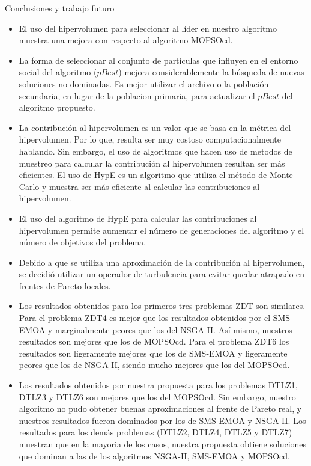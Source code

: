 \begin{chapter}{Conclusiones y trabajo futuro}
\begin{itemize}
  \item El uso del hipervolumen para seleccionar al l\'ider en nuestro algoritmo muestra una mejora con respecto al algoritmo MOPSOcd. 
  
  \item La forma de seleccionar al conjunto de part\'iculas que influyen en el entorno social  del algoritmo ($pBest$) mejora 
  considerablemente la b\'usqueda de nuevas soluciones no dominadas. Es mejor utilizar el archivo o la poblaci\'on
  secundaria, en lugar de la poblacion primaria, para actualizar el $pBest$ del algoritmo propuesto.
  
  \item La contribuci\'on al hipervolumen es un valor que se basa en la m\'etrica del hipervolumen. Por lo que, resulta ser muy costoso 
  computacionalmente hablando. Sin embargo, el uso de algoritmos que hacen uso de metodos 
  de muestreo para calcular la contribuci\'on al hipervolumen resultan ser m\'as eficientes. El uso de HypE 
  es un algoritmo que utiliza el m\'etodo de Monte Carlo y muestra ser m\'as eficiente al calcular las contribuciones al hipervolumen.
  
  \item El uso del algoritmo de HypE para calcular las contribuciones al hipervolumen permite aumentar el n\'umero de generaciones 
  del algoritmo y el n\'umero de objetivos del problema.
  
  \item Debido a que se utiliza una aproximaci\'on de la contribuci\'on al hipervolumen, se decidi\'o utilizar un operador de 
  turbulencia para evitar quedar atrapado en frentes de Pareto locales.
  
  \item Los resultados obtenidos para los primeros tres problemas ZDT son similares. Para el problema ZDT4 es mejor que los resultados 
  obtenidos por el SMS-EMOA y marginalmente peores que los del NSGA-II. As\'i mismo, nuestros resultados son mejores que los de 
  MOPSOcd. Para el problema ZDT6 los resultados son ligeramente mejores que los de SMS-EMOA y ligeramente peores que los de NSGA-II, 
  siendo mucho mejores que los del MOPSOcd.
  
  \item Los resultados obtenidos por nuestra propuesta para los problemas DTLZ1, DTLZ3 y DTLZ6 son mejores que los del MOPSOcd.
  Sin embargo, nuestro algoritmo no pudo obtener buenas aproximaciones al frente de Pareto real, y nuestros resultados fueron dominados
  por los de SMS-EMOA y NSGA-II. Los resultados para los dem\'as problemas (DTLZ2, DTLZ4, DTLZ5 y DTLZ7) muestran que en la mayoria 
  de los casos, nuestra propuesta obtiene soluciones que dominan a las de los algoritmos NSGA-II, SMS-EMOA y MOPSOcd.
  

\end{itemize}
\end{chapter}
